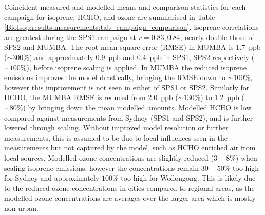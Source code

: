 \documentclass[acp, manuscript]{copernicus}
\begin{document}
    Coincident measured and modelled means and comparison statistics for each campaign for isoprene, HCHO, and ozone are summarised in Table \ref{BioIsop:results:measurements:tab_campaign_comparison}.
    Isoprene correlations are greatest during the SPS1 campaign at $r=0.83,0.84$, nearly double those of SPS2 and MUMBA.
    The root mean square error (RMSE) in MUMBA is 1.7~ppb ($\sim 300\%$) and approximately 0.9~ppb and 0.4~ppb in SPS1, SPS2 respectively ($\sim 100\%$),  before isoprene scaling is applied.
    In MUMBA the reduced isoprene emissions improves the model drastically, bringing the RMSE down to $\sim{100}\%$, however this improvement is not seen in either of SPS1 or SPS2.
    Similarly for HCHO, the MUMBA RMSE is reduced from 2.0~ppb ($\sim{130}\%$) to 1.2~ppb ($\sim{80}\%$) by bringing down the mean modelled amounts.
    Modelled HCHO is low compared against measurements from Sydney (SPS1 and SPS2), and is further lowered through scaling.
    Without improved model resolution or further measurements, this is assumed to be due to local influences seen in the measurements but not captured by the model, such as HCHO enriched air from local sources.
    Modelled ozone concentrations are slightly reduced ($3-8\%$) when scaling isoprene emissions, however the concentrations remain $30-50\%$ too high for Sydney and approximately $100\%$ too high for Wollongong.
    This is likely due to the reduced ozone concentrations in cities compared to regional areas, as the modelled ozone concentrations are averages over the larger area which is mostly non-urban.
    
\end{document}
